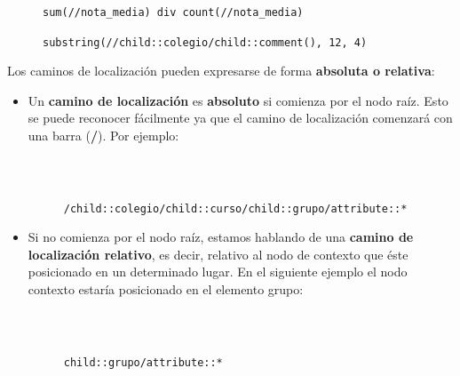 \begin{figure}[H]
    \begin{tcolorbox}[sharp corners, colback=yellow!30, colframe=white!20]
        \scriptsize
        \begin{verbatim}


sum(//nota_media) div count(//nota_media)

substring(//child::colegio/child::comment(), 12, 4)
        \end{verbatim}
    \end{tcolorbox}
\end{figure}

Los caminos de localización pueden expresarse de forma \textbf{absoluta o relativa}:

\begin{itemize}
    \item Un \textbf{camino de localización} es \textbf{absoluto} si comienza por el nodo raíz. Esto se puede reconocer fácilmente ya que el camino de localización comenzará con una barra (\textbf{/}). Por ejemplo:

    \begin{figure}[H]
        \begin{tcolorbox}[sharp corners, colback=yellow!30, colframe=white!20]
            \scriptsize
            \begin{verbatim}


            /child::colegio/child::curso/child::grupo/attribute::*
            \end{verbatim}
        \end{tcolorbox}
    \end{figure}

    \item Si no comienza por el nodo raíz, estamos hablando de una \textbf{camino de localización relativo}, es decir, relativo al nodo de contexto que éste posicionado en un determinado lugar. En el siguiente ejemplo el nodo contexto estaría posicionado en el elemento grupo:

    \begin{figure}[H]
    \begin{tcolorbox}[sharp corners, colback=yellow!30, colframe=white!20]
        \scriptsize
        \begin{verbatim}


                               child::grupo/attribute::*
        \end{verbatim}
    \end{tcolorbox}
\end{figure}
\end{itemize}

